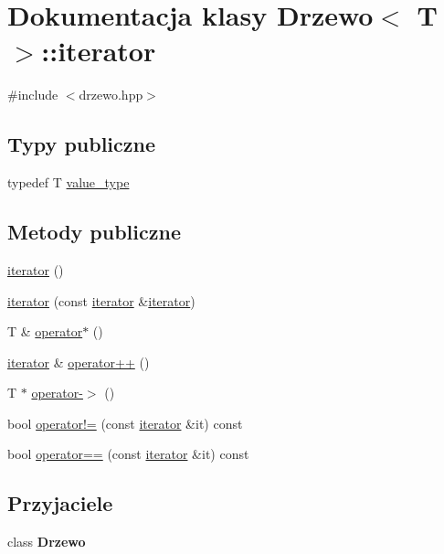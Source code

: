 \hypertarget{class_drzewo_1_1iterator}{}\section{Dokumentacja klasy Drzewo$<$ T $>$\+:\+:iterator}
\label{class_drzewo_1_1iterator}


{\ttfamily \#include $<$drzewo.\+hpp$>$}

\subsection*{Typy publiczne}
\begin{DoxyCompactItemize}
\item 
typedef T \hyperlink{class_drzewo_1_1iterator_a7ba4387023d41aafa83791b42fc5b5ee}{value\+\_\+type}
\end{DoxyCompactItemize}
\subsection*{Metody publiczne}
\begin{DoxyCompactItemize}
\item 
\hyperlink{class_drzewo_1_1iterator_a279751514e51594342daa7a7ed501a38}{iterator} ()
\item 
\hyperlink{class_drzewo_1_1iterator_a627d8a55a11ad8be75493634c6fe07b2}{iterator} (const \hyperlink{class_drzewo_1_1iterator}{iterator} \&\hyperlink{class_drzewo_1_1iterator}{iterator})
\item 
T \& \hyperlink{class_drzewo_1_1iterator_ab2ee76d0390832e9bed32a829f08f328}{operator$\ast$} ()
\item 
\hyperlink{class_drzewo_1_1iterator}{iterator} \& \hyperlink{class_drzewo_1_1iterator_a8b67f4409ee4532a89e745744ba6f8b3}{operator++} ()
\item 
T $\ast$ \hyperlink{class_drzewo_1_1iterator_ac982660e25eb9720b5c81b6ccff0559e}{operator-\/$>$} ()
\item 
bool \hyperlink{class_drzewo_1_1iterator_afb65420073bdc0e231f0752227de5dcc}{operator!=} (const \hyperlink{class_drzewo_1_1iterator}{iterator} \&it) const
\item 
bool \hyperlink{class_drzewo_1_1iterator_ab701b082f0d712968b2fa1d45e3595a8}{operator==} (const \hyperlink{class_drzewo_1_1iterator}{iterator} \&it) const
\end{DoxyCompactItemize}
\subsection*{Przyjaciele}
\begin{DoxyCompactItemize}
\item 
\mbox{\label{class_drzewo_1_1iterator_a1c4e4c3515fb1b999118d69c354d7efd}} 
class {\bfseries Drzewo}
\end{DoxyCompactItemize}


